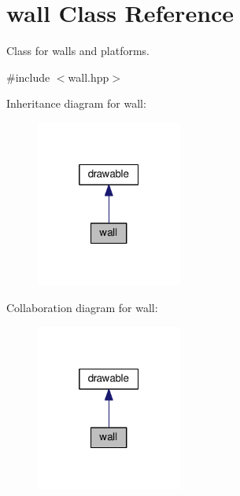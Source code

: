\hypertarget{classwall}{}\section{wall Class Reference}
\label{classwall}


Class for walls and platforms.  




{\ttfamily \#include $<$wall.\+hpp$>$}



Inheritance diagram for wall\+:\nopagebreak
\begin{figure}[H]
\begin{center}
\leavevmode
\includegraphics[width=136pt]{classwall__inherit__graph}
\end{center}
\end{figure}


Collaboration diagram for wall\+:\nopagebreak
\begin{figure}[H]
\begin{center}
\leavevmode
\includegraphics[width=136pt]{classwall__coll__graph}
\end{center}
\end{figure}
